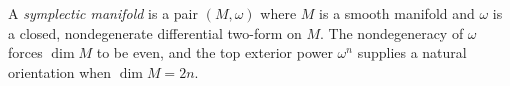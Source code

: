 
A \emph{symplectic manifold} is a pair $(M,\omega)$ where $M$ is a smooth manifold and $\omega$ is a closed, nondegenerate differential two-form on $M$. The nondegeneracy of $\omega$ forces $\dim M$ to be even, and the top exterior power $\omega^n$ supplies a natural orientation when $\dim M=2n$.
